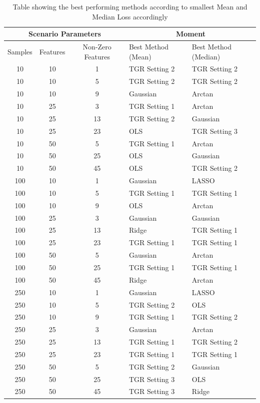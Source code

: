 \documentclass[12pt,a4paper]{article}
\begin{document}
\begin{table}[h!]
\begin{tabular}{ccc|l|l}
\toprule
\multicolumn{3}{c}{Scenario Parameters} & \multicolumn{2}{c}{Moment}\\
\midrule
Samples & Features & Non-Zero Features & Best Method (Mean) & Best Method (Median) \\
\midrule
10 & 10 & 1 & TGR Setting 2 & TGR Setting 2 \\
10 & 10 & 5 & TGR Setting 2 & TGR Setting 2 \\
10 & 10 & 9 & Gaussian & Arctan \\
10 & 25 & 3 & TGR Setting 1 & Arctan \\
10 & 25 & 13 & TGR Setting 2 & Gaussian \\
10 & 25 & 23 & OLS & TGR Setting 3 \\
10 & 50 & 5 & TGR Setting 1 & Arctan \\
10 & 50 & 25 & OLS & Gaussian \\
10 & 50 & 45 & OLS & TGR Setting 2 \\
100 & 10 & 1 & Gaussian & LASSO \\
100 & 10 & 5 & TGR Setting 1 & TGR Setting 1 \\
100 & 10 & 9 & OLS & Arctan \\
100 & 25 & 3 & Gaussian & Gaussian \\
100 & 25 & 13 & Ridge & TGR Setting 1 \\
100 & 25 & 23 & TGR Setting 1 & TGR Setting 1 \\
100 & 50 & 5 & Gaussian & Arctan \\
100 & 50 & 25 & TGR Setting 1 & TGR Setting 1 \\
100 & 50 & 45 & Ridge & Arctan \\
250 & 10 & 1 & Gaussian & LASSO \\
250 & 10 & 5 & TGR Setting 2 & OLS \\
250 & 10 & 9 & TGR Setting 1 & TGR Setting 2 \\
250 & 25 & 3 & Gaussian & Arctan \\
250 & 25 & 13 & TGR Setting 1 & TGR Setting 2 \\
250 & 25 & 23 & TGR Setting 1 & TGR Setting 1 \\
250 & 50 & 5 & TGR Setting 2 & Gaussian \\
250 & 50 & 25 & TGR Setting 3 & OLS \\
250 & 50 & 45 & TGR Setting 3 & Ridge \\
\bottomrule
\end{tabular}
\caption{Table showing the best performing methods according to smallest Mean and Median Loss accordingly}
\label{tab:bestmethod}
\end{table}
\end{document}
